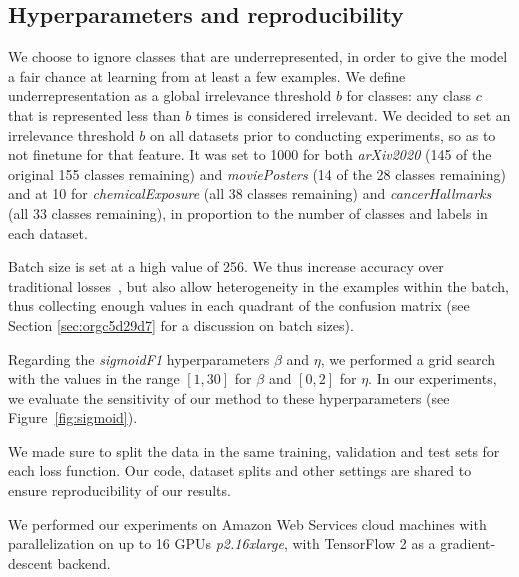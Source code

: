 \subsection{Hyperparameters and reproducibility}
\label{subsec:hypers}

We choose to ignore classes that are underrepresented, in order to give the model a fair chance at learning from at least a few examples. We define underrepresentation as a global irrelevance threshold $b$ for classes: any class $c$ that is represented less than $b$ times is considered irrelevant. We decided to set an irrelevance threshold $b$ on all datasets prior to conducting experiments, so as to not finetune for that feature. It was set to 1000 for both \emph{arXiv2020} (145 of the original 155 classes remaining) and \emph{moviePosters} (14 of the 28 classes remaining) and at 10 for \emph{chemicalExposure} (all 38 classes remaining) and \emph{cancerHallmarks} (all 33 classes remaining), in proportion to the number of classes and labels in each dataset.

Batch size is set at a high value of 256. We thus increase accuracy over traditional losses~\cite{bigBSArxiv}, but also allow heterogeneity in the examples within the batch, thus collecting enough values in each quadrant of the confusion matrix (see Section \ref{sec:orgc5d29d7} for a discussion on batch sizes).

Regarding the \emph{sigmoidF1} hyperparameters $\beta$ and $\eta$, we performed a grid search with the values in the range $[1,30]$ for $\beta$ and $[0, 2]$ for $\eta$.
In our experiments, we evaluate the sensitivity of our method to these hyperparameters (see Figure~\ref{fig:sigmoid}).

We made sure to split the data in the same training, validation and test sets for each loss function. Our code, dataset splits and other settings are shared to ensure reproducibility of our results.

We performed our experiments on Amazon Web Services cloud machines with parallelization on up to 16 GPUs \textit{p2.16xlarge}, with TensorFlow 2 as a gradient-descent backend.
